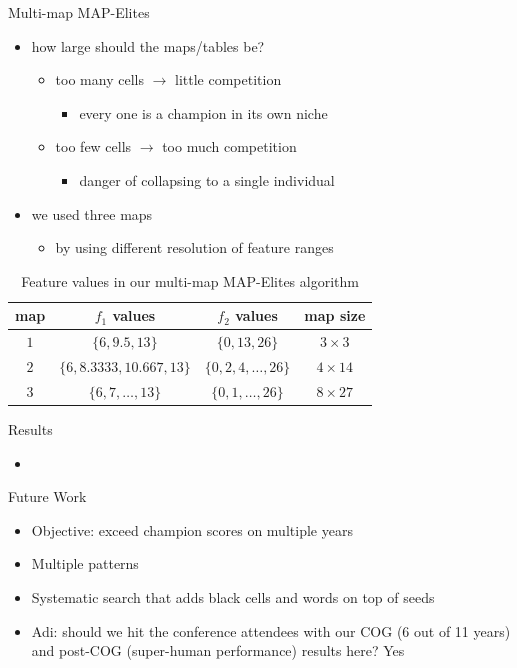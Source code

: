 \documentclass[aspectratio=169,usenames,dvipsnames]{beamer}
\newcommand{\tcm}[1]{\textcolor{m7}{#1}}
\newcommand{\bei}{\begin{itemize}}
\newcommand{\eei}{\end{itemize}}
\newcommand{\ie}{\item}
\numberwithin{equation}{section}
\numberwithin{theorem}{section}
\numberwithin{lem}{section}
\numberwithin{df}{section}
\begin{document}
\begin{frame}{Multi-map MAP-Elites}

\bei

\ie how large should the maps/tables be?
\bei
\ie too many cells $\to$ little competition
\bei
\ie every one is a champion in its own niche
\eei

\ie too few cells $\to$ too much competition
\bei
\ie danger of collapsing to a single individual
\eei
\eei

\bigskip

\ie we used three maps
\bei
\ie by using different resolution of feature ranges
\eei

\eei

\begin{table}
{\small\centering
\begin{tabular}{c|c|c|c}
\toprule
{\bf map} & {\bf $f_1$ values} & {\bf $f_2$ values} & {\bf map size} \\
\midrule
$1$ & $\{6,9.5,13\}$ & $\{0,13,26\}$ & $3 \times 3$ \\
$2$ & $\{6,8.3333,10.667,13\}$ & $\{0,2,4,\dots,26\}$ & $4 \times 14$\\
$3$ & $\{6,7,\dots,13\}$ & $\{0,1,\dots,26\}$ & $8 \times 27$\\
\bottomrule
\end{tabular}}
\caption{Feature values in our multi-map MAP-Elites algorithm}
\label{tab:mrme}
\end{table}

\end{frame}



\begin{frame}{Results}

\bei

\ie 

\bigskip

\eei


\end{frame}




\begin{frame}{Future Work}

\bei

\ie Objective: exceed champion scores on multiple years

\ie Multiple patterns

\ie Systematic search that adds black cells and words on top of seeds

\bigskip

\ie \tcm{Adi: should we hit the conference attendees with our COG (6 out of 11 years) and post-COG (super-human performance) results here?} \tcm{Yes}

\bigskip

\eei


\end{frame}
\end{document}
